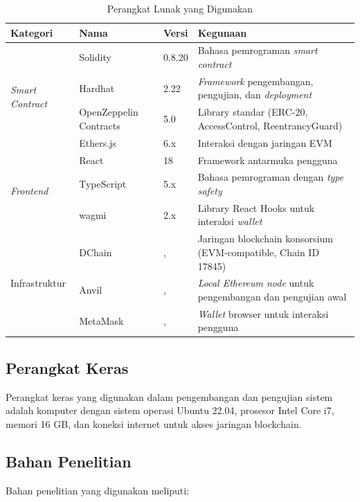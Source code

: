 \begin{table}[H]
\centering
\caption{Perangkat Lunak yang Digunakan}
\label{tab:alat-lunak}
\small
\begin{tabular}{p{}p{}p{}p{}}
\toprule
\textbf{Kategori} & \textbf{Nama} & \textbf{Versi} & \textbf{Kegunaan} \\
\midrule
\multirow{4}{*}{\textit{Smart Contract}} & Solidity & 0.8.20 & Bahasa pemrograman \textit{smart contract} \\
 & Hardhat & 2.22 & \textit{Framework} pengembangan, pengujian, dan \textit{deployment} \\
 & OpenZeppelin Contracts & 5.0 & Library standar (ERC-20, AccessControl, ReentrancyGuard) \\
 & Ethers.js & 6.x & Interaksi dengan jaringan EVM \\
\midrule
\multirow{3}{*}{\textit{Frontend}} & React & 18 & Framework antarmuka pengguna \\
 & TypeScript & 5.x & Bahasa pemrograman dengan \textit{type safety} \\
 & wagmi & 2.x & Library React Hooks untuk interaksi \textit{wallet} \\
\midrule
\multirow{3}{*}{Infrastruktur} & DChain &, & Jaringan blockchain konsorsium (EVM-compatible, Chain ID 17845) \\
 & Anvil &, & \textit{Local Ethereum node} untuk pengembangan dan pengujian awal \\
 & MetaMask &, & \textit{Wallet} browser untuk interaksi pengguna \\
\bottomrule
\end{tabular}
\end{table}

\subsection{Perangkat Keras}

Perangkat keras yang digunakan dalam pengembangan dan pengujian sistem adalah komputer dengan sistem operasi Ubuntu 22.04, prosesor Intel Core i7, memori 16 GB, dan koneksi internet untuk akses jaringan blockchain.

\subsection{Bahan Penelitian}

Bahan penelitian yang digunakan meliputi:

